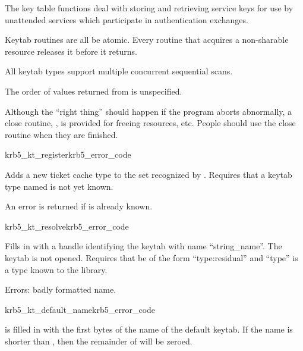 The key table functions deal with storing and retrieving service keys
for use by unattended services which participate in authentication exchanges.

Keytab routines are all be atomic.  Every routine that acquires
a non-sharable resource releases it before it returns. 

All keytab types support multiple concurrent sequential scans.

The order of values returned from  is
unspecified.

Although the ``right thing'' should happen if the program aborts
abnormally, a close routine, ,  is provided
for freeing resources, etc.  People should use the close routine when
they are finished.

\begin{funcdecl}{krb5_kt_register}{krb5_error_code}{\funcinout}
\funcin
{}
\end{funcdecl}


Adds a new ticket cache type to the set recognized by
.
Requires that a keytab type named  is not
yet known.

An error is returned if  is already known.

\begin{funcdecl}{krb5_kt_resolve}{krb5_error_code}{\funcinout}
\funcin
{}
\funcout
{}
\end{funcdecl}

Fills in  with a handle identifying the keytab with name
``string_name''.  The keytab is not opened.
Requires that  be of the form ``type:residual'' and
``type'' is a type known to the library.

Errors: badly formatted name.
		
\begin{funcdecl}{krb5_kt_default_name}{krb5_error_code}{\funcinout}
\funcin
{}
\end{funcdecl}

 is filled in with the first  bytes of
the name of the default keytab.
If the name is shorter than , then the remainder of
 will be zeroed.



